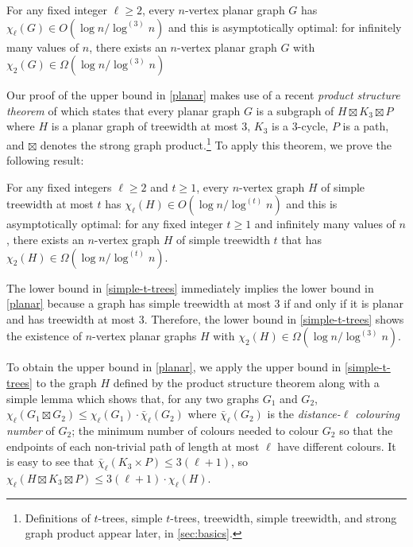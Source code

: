 \documentclass[kpfonts]{patmorin}
\newcommand{\trn}{\chi_2}
\newcommand{\lrn}{\chi_{\ell}}
\newcommand{\dlcn}{\bar{\chi}_\ell}
\theoremstyle{named}
\begin{document}
\begin{thm}\label{planar}
    For any fixed integer $\ell\ge 2$, every $n$-vertex planar graph $G$ has $\lrn(G)\in O(\log n/\log^{(3)} n)$ and this is asymptotically optimal: for infinitely many values of $n$, there exists an $n$-vertex planar graph $G$ with $\trn(G)\in \Omega(\log n/\log^{(3)} n)$
\end{thm}


Our proof of the upper bound in \cref{planar} makes use of a recent \emph{product structure theorem} of \citet{dujmovic.joret.ea:planar} which states that every planar graph $G$ is a subgraph of $H\boxtimes K_3\boxtimes P$ where $H$ is a planar graph of treewidth at most $3$, $K_3$ is a 3-cycle, $P$ is a path, and $\boxtimes$ denotes the strong graph product.\footnote{Definitions of $t$-trees, simple $t$-trees, treewidth, simple treewidth, and strong graph product appear later, in \cref{sec:basics}.}  To apply this theorem, we prove the following result:

\begin{thm}\label{simple-t-trees}
    For any fixed integers $\ell\ge 2$ and $t\ge 1$, every $n$-vertex graph $H$ of simple treewidth at most $t$ has $\lrn(H) \in O(\log n/\log^{(t)}n)$ and this is asymptotically optimal: for any fixed integer $t\ge 1$ and infinitely many values of $n$, there exists an $n$-vertex graph $H$ of simple treewidth $t$ that has $\trn(H)\in\Omega(\log n/\log^{(t)} n)$.
\end{thm}

The lower bound in \cref{simple-t-trees} immediately implies the lower bound in \cref{planar} because a graph has simple treewidth at most 3 if and only if it is planar and has treewidth at most 3. Therefore, the lower bound in \cref{simple-t-trees} shows the existence of $n$-vertex planar graphs $H$ with $\trn(H)\in\Omega(\log n/\log^{(3)} n)$.

To obtain the upper bound in \cref{planar}, we apply the upper bound in \cref{simple-t-trees} to the graph $H$ defined by the product structure theorem along with a simple lemma which shows that, for any two graphs $G_1$ and $G_2$, $\lrn(G_1\boxtimes G_2)\le \lrn(G_1)\cdot\dlcn(G_2)$ where $\dlcn(G_2)$ is the \emph{distance-$\ell$ colouring number} of $G_2$;  the minimum number of colours needed to colour $G_2$ so that the endpoints of each non-trivial path of length at most $\ell$ have different colours.  It is easy to see that $\dlcn(K_3\times P)\le 3(\ell+1)$, so $\lrn(H\boxtimes K_3\boxtimes P)\le 3(\ell+1)\cdot\lrn(H)$.
\end{document}

